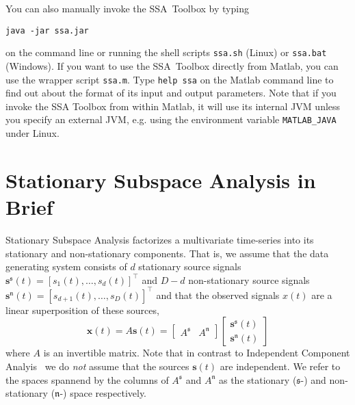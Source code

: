 \documentclass{article}
\newcommand{\1}{\ensuremath{\mathds{1}}}
\newcommand{\s}{\ensuremath{\mathfrak{s}}}
\newcommand{\n}{\ensuremath{\mathfrak{n}}}
\newcommand{\0}{\ensuremath{0}}
\begin{document}
You can also manually invoke the SSA~Toolbox by typing
\begin{center}
  \texttt{java -jar ssa.jar}
\end{center}
on the command line or running the shell scripts \texttt{ssa.sh} (Linux)
or \texttt{ssa.bat} (Windows). If you want to use the SSA~Toolbox directly from Matlab, 
you can use the wrapper script \texttt{ssa.m}. Type \texttt{help ssa} on the Matlab 
command line to find out about the format of its input and output parameters. 
Note that if you invoke the SSA Toolbox from within Matlab, it will use its
internal JVM unless you specify an external JVM, e.g. using the environment
variable \texttt{MATLAB\_JAVA} under Linux.

\section{Stationary Subspace Analysis in Brief}

Stationary Subspace Analysis \cite{PRL:SSA:2009} factorizes a multivariate time-series 
into its stationary and non-stationary components. That is, we assume that the data 
generating system consists of $d$ stationary source signals 
${\mathbf s^\s}(t) = [s_1(t), \dots, s_d(t)]^\top$ and $D-d$ non-stationary source signals
${\mathbf s^\n}(t) = [s_{d+1}(t), \dots, s_D(t)]^\top$ and that the observed signals 
$x(t)$ are a linear superposition of these sources,
\begin{equation}
  {\mathbf x}(t) = A {\mathbf s}(t) = 
    \begin{bmatrix} A^{\s} & A^{\n} \end{bmatrix}
    \begin{bmatrix} {\mathbf s^{\s}}(t) \\ {\mathbf s^{\n}}(t) \end{bmatrix}
\label{eq:mixing_model}
\end{equation}
where $A$ is an invertible matrix. Note that in contrast to 
Independent Component Analyis~\cite{ICABook} we do \textit{not} assume that 
the sources ${\mathbf s}(t)$ are independent. We refer to the spaces spannend 
by the columns of $A^{\s}$ and $A^{\n}$ as the stationary ($\s$-) and 
non-stationary ($\n$-) space respectively.  
\end{document}
